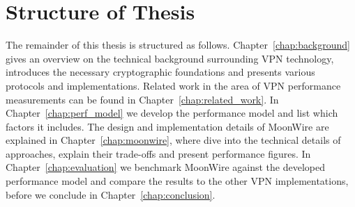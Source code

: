 \section{Structure of Thesis}
The remainder of this thesis is structured as follows.
Chapter~\ref{chap:background} gives an overview on the technical background surrounding VPN technology, introduces the necessary cryptographic foundations and presents various protocols and implementations. 
Related work in the area of VPN performance measurements can be found in Chapter~\ref{chap:related_work}. %
In Chapter~\ref{chap:perf_model} we develop the performance model and list which factors it includes.
The design and implementation details of MoonWire are explained in Chapter~\ref{chap:moonwire}, where dive into the technical details of approaches, explain their trade-offs and present performance figures.
In Chapter~\ref{chap:evaluation} we benchmark MoonWire against the developed performance model and compare the results to the other VPN implementations, before we conclude in Chapter~\ref{chap:conclusion}.

